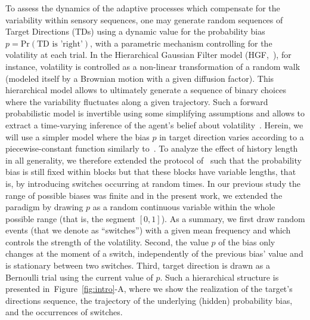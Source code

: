 \documentclass[12pt,english]{article}%
\newcommand{\citep}[1]{\parencite{#1}}
\newcommand{\citet}[1]{\textcite{#1}}
\newcommand{\seeFig}[1]{Figure~\ref{fig:#1}}
\begin{document}
To assess the dynamics of the adaptive processes
which compensate for the variability within sensory sequences,
one may generate random sequences of Target Directions (TDs)
using a dynamic value for the probability bias $p = \text{Pr}(\text{TD is 'right'})$,
with a parametric mechanism controlling for the volatility at each trial.
In the Hierarchical Gaussian Filter model (HGF,~\citet{Mathys11}), for instance,
volatility is controlled as a non-linear transformation
of a random walk (modeled itself by a Brownian motion with a given diffusion factor).
This hierarchical model allows to ultimately generate a sequence of binary choices
where the variability fluctuates along a given trajectory.
Such a forward probabilistic model is invertible
using some simplifying assumptions and allows
to extract a time-varying inference of the agent's belief about volatility~\citep{Vossel14}.
Herein, we will use a simpler model where
the bias $p$ in target direction varies according to a piecewise-constant function
similarly to~\citet{Meyniel13}.
To analyze the effect of history length in all generality,
we therefore extended the protocol of~\citep{Montagnini2010} such that the probability bias
is still fixed within blocks but that these blocks have variable lengths,
that is, by introducing switches occurring at random times.
In our previous study
the range of possible biases was finite
and in the present work, we extended the paradigm
by drawing $p$ as a random continuous variable
within the whole possible range (that is, the segment $[ 0, 1 ]$).
As a summary, we first draw random events (that we denote as ``switches'')
with a given mean frequency and which controls the strength of the volatility.
Second, the value $p$ of the bias only changes at the moment of a switch,
independently of the previous bias' value
and is stationary between two switches.
Third, target direction is drawn as a Bernoulli trial using the current value of $p$.
Such a hierarchical structure is presented in~\seeFig{intro}-A,
where we show the realization of the target's directions sequence,
the trajectory of the underlying (hidden) probability bias, and
the occurrences of switches.
\end{document}
